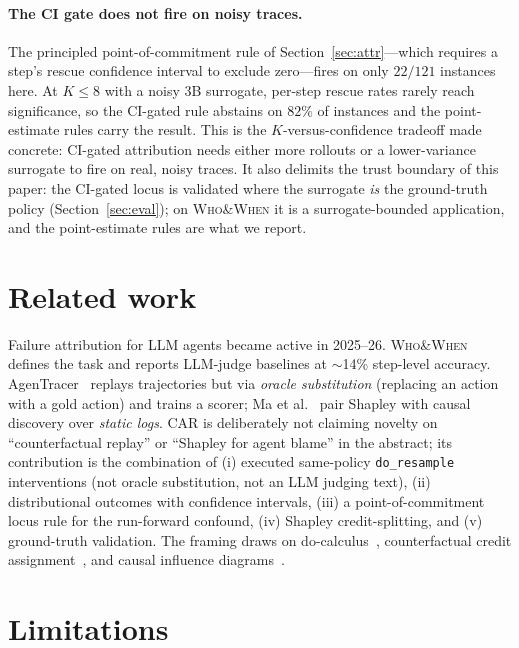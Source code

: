 \documentclass[11pt]{article}
\begin{document}
\paragraph{The CI gate does not fire on noisy traces.} The principled point-of-commitment rule of
Section~\ref{sec:attr}---which requires a step's rescue confidence interval to exclude zero---fires
on only $22/121$ instances here. At $K\le 8$ with a noisy $3$B surrogate, per-step rescue rates
rarely reach significance, so the CI-gated rule abstains on $82\%$ of instances and the
point-estimate rules carry the result. This is the $K$-versus-confidence tradeoff made concrete:
CI-gated attribution needs either more rollouts or a lower-variance surrogate to fire on real,
noisy traces. It also delimits the trust boundary of this paper: the CI-gated locus is validated
where the surrogate \emph{is} the ground-truth policy (Section~\ref{sec:eval}); on
\textsc{Who\&When} it is a surrogate-bounded application, and the point-estimate rules are what we
report.

\section{Related work}

Failure attribution for LLM agents became active in 2025--26. \textsc{Who\&When}~\cite{whowhen}
defines the task and reports LLM-judge baselines at $\sim$14\% step-level accuracy.
AgenTracer~\cite{agentracer} replays trajectories but via \emph{oracle substitution} (replacing an
action with a gold action) and trains a scorer; Ma et al.~\cite{causalattr2025} pair Shapley with
causal discovery over \emph{static logs}. CAR is deliberately not claiming novelty on ``counterfactual
replay'' or ``Shapley for agent blame'' in the abstract; its contribution is the combination of
(i) executed same-policy \texttt{do\_resample} interventions (not oracle substitution, not an LLM
judging text), (ii) distributional outcomes with confidence intervals, (iii) a point-of-commitment
locus rule for the run-forward confound, (iv) Shapley credit-splitting, and (v) ground-truth
validation. The framing draws on do-calculus~\cite{pearl2009}, counterfactual credit
assignment~\cite{mesnard2021,coma2018}, and causal influence
diagrams~\cite{everitt2021,kenton2023}.

\section{Limitations}
\end{document}
